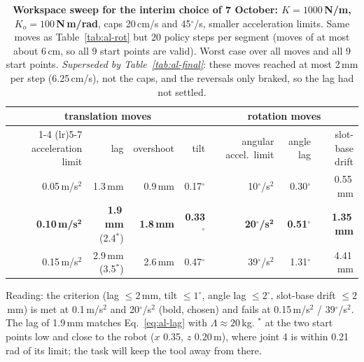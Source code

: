 \begin{table}[h]
  \centering
  \caption{\textbf{Workspace sweep for the interim choice of 7 October: $K = 1000$\,N/m, $K_o = 100$\,N\,m/rad}, caps
  20\,cm/s and 45$^\circ$/s, smaller acceleration limits. Same moves as Table~\ref{tab:al-rot} but 20 policy steps per
  segment (moves of at most about 6\,cm, so all 9 start points are valid). Worst case over all moves and all 9 start
  points. \emph{Superseded by Table~\ref{tab:al-final}}: these moves reached at most 2\,mm per step (6.25\,cm/s), not
  the caps, and the reversals only braked, so the lag had not settled.}
  \label{tab:al-b1}
  {\renewcommand{\arraystretch}{1.15}
  \begin{tabular}{rrrrrrr}
    \toprule
    \multicolumn{4}{c}{translation moves} & \multicolumn{3}{c}{rotation moves} \\
    \cmidrule(lr){1-4} \cmidrule(lr){5-7}
    acceleration limit & lag & overshoot & tilt & angular accel.\ limit & angle lag & slot-base drift \\
    \midrule
    0.05\,m/s$^2$ & 1.3\,mm & 0.9\,mm & 0.17$^\circ$ & 10$^\circ$/s$^2$ & 0.30$^\circ$ & 0.55\,mm \\
    \textbf{0.10\,m/s}$^\mathbf{2}$ & \textbf{1.9\,mm} (2.4$^*$) & \textbf{1.8\,mm} & \textbf{0.33}$^\circ$ &
      \textbf{20}$^\circ$\textbf{/s}$^\mathbf{2}$ & \textbf{0.51}$^\circ$ & \textbf{1.35\,mm} \\
    0.15\,m/s$^2$ & 2.9\,mm (3.5$^*$) & 2.6\,mm & 0.47$^\circ$ & 39$^\circ$/s$^2$ & 1.31$^\circ$ & 4.41\,mm \\
    \bottomrule
  \end{tabular}}

  \smallskip
  {\small Reading: the criterion (lag $\le 2$\,mm, tilt $\le 1^\circ$, angle lag $\le 2^\circ$, slot-base drift $\le 2$\,mm)
  is met at 0.1\,m/s$^2$ and 20$^\circ$/s$^2$ (bold, chosen) and fails at 0.15\,m/s$^2$ / 39$^\circ$/s$^2$. The lag
  of 1.9\,mm matches Eq.~\eqref{eq:al-lag} with $\Lambda \approx 20$\,kg. $^*$ at the two start points low and close
  to the robot ($x$ 0.35, $z$ 0.20\,m), where joint 4 is within 0.21\,rad of its limit; the task will keep the tool
  away from there.}
\end{table}

